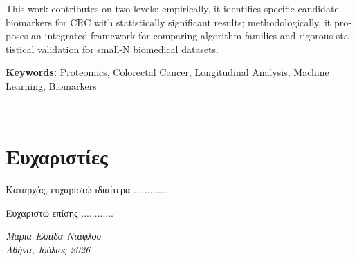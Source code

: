 \documentclass[12pt, a4paper]{article}
\begin{document}
\begin{english}
This work contributes on two levels: empirically, it identifies specific candidate biomarkers for CRC with statistically significant results; methodologically, it proposes an integrated framework for comparing algorithm families and rigorous statistical validation for small-N biomedical datasets.

\vspace{4cm}
\noindent\textbf{Keywords:} Proteomics, Colorectal Cancer, Longitudinal Analysis, Machine Learning, Biomarkers
\end{english}

\clearpage
\thispagestyle{empty}
~
\clearpage

\thispagestyle{plain}
\section*{Ευχαριστίες}


Καταρχάς, ευχαριστώ ιδιαίτερα ..............

Ευχαριστώ επίσης ............


\vspace{1cm}
\hfill\textit{Μαρία Ελπίδα Ντάφλου}\\
\hspace*{\fill}\textit{Αθήνα, Ιούλιος 2026}

\clearpage
\thispagestyle{empty}
~
\clearpage

\thispagestyle{plain}
\renewcommand{\contentsname}{Περιεχόμενα}
\tableofcontents
\newpage
















\end{document}
